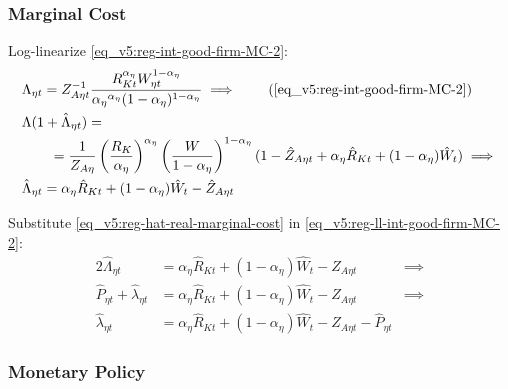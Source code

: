 \documentclass[../thesis.tex]{subfiles}
\begin{document}

\subsubsection*{Marginal Cost}

Log-linearize \ref{eq_v5:reg-int-good-firm-MC-2}:
\begin{alignat}{2}
	& \Lambda_{\eta t} = Z_{A\eta t}^{-1} \frac{R_{Kt}^{{\alpha_{\eta}}} W_{\eta t}^{1-\alpha_{\eta}}}{{\alpha_{\eta}}^{{\alpha_{\eta}}} (1-\alpha_{\eta})^{1-\alpha_{\eta}}} \implies \tag{\ref{eq_v5:reg-int-good-firm-MC-2}} \\
	& \Lambda (1+ \hat{\Lambda}_{\eta t}) = \nonumber \\ & \qquad = \frac{1}{Z_{A\eta}} \left( \frac{R_{K}}{{\alpha_{\eta}}} \right)^{{\alpha_{\eta}}} \left( \frac{W}{1-\alpha_{\eta}} \right)^{1-\alpha_{\eta}} (1- \hat{Z}_{A\eta t} + {\alpha_{\eta}} \hat{R}_{Kt} + (1- {\alpha_{\eta}}) \hat{W}_{t} ) \implies \nonumber \\
	& \hat{\Lambda}_{\eta t} = {\alpha_{\eta}} \hat{R}_{Kt} + (1- {\alpha_{\eta}}) \hat{W}_{t} - \hat{Z}_{A\eta t} \label{eq_v5:reg-ll-int-good-firm-MC-2}
\end{alignat}

Substitute \ref{eq_v5:reg-hat-real-marginal-cost} in \ref{eq_v5:reg-ll-int-good-firm-MC-2}:
\begin{alignat}{2}
	\hat{\Lambda}_{\eta t} &= {\alpha_{\eta}} \hat{R}_{Kt} + (1- {\alpha_{\eta}}) \hat{W}_{t} - \hat{Z}_{A\eta t} &\implies \nonumber \\
	\hat{P}_{\eta t} + \hat{\lambda}_{\eta t} &= {\alpha_{\eta}} \hat{R}_{Kt} + (1- {\alpha_{\eta}}) \hat{W}_{t} - \hat{Z}_{A\eta t} &\implies \nonumber \\
	\hat{\lambda}_{\eta t} &= {\alpha_{\eta}} \hat{R}_{Kt} + (1- {\alpha_{\eta}}) \hat{W}_{t} - \hat{Z}_{A\eta t} - \hat{P}_{\eta t} \label{eq_v5:reg-ll-int-good-firm-MC-3}
\end{alignat}


\subsubsection*{Monetary Policy}
\end{document}
